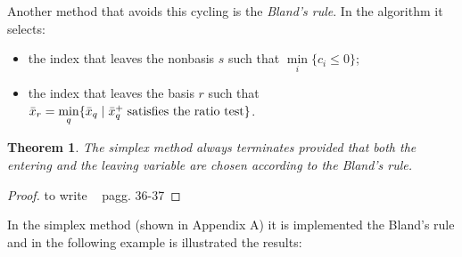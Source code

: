 \documentclass[a4paper,10 pt,titlepage,twoside]{book}
\theoremstyle{plain}
\newtheorem*{theorem*}{Theorem}
\theoremstyle{definition}
\theoremstyle{remark}
\begin{document}
Another method that avoids this cycling is the \textit{Bland's rule}. In the algorithm it selects:
\begin{itemize}
	\item the index that leaves the nonbasis $s$ such that $\min\limits_{i}\{c_{i}\leq0\}$;
\item the index that leaves the basis $r$ such that $\bar{x}_{r} = \min\limits_{q}\{\bar{x}_{q}\;|\;\bar{x}_{q}^{+} \text{\;satisfies the ratio test} \}$. \end{itemize} 
\begin{theorem*}
	The simplex method always terminates provided that both the entering and the leaving variable are chosen according to the Bland's rule.
\end{theorem*}
\begin{proof}
to write ~\cite{LP} pagg. 36-37	
\end{proof}
In the simplex method (shown in Appendix A) it is implemented the Bland's rule and in the following example is illustrated the results:
\end{document}
